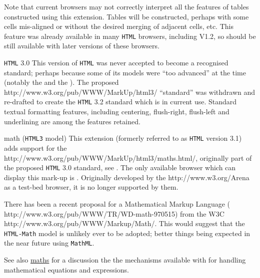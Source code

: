\begin{htmllist}
Note that current browsers may not correctly interpret all
the features of tables constructed using this extension.
Tables will be constructed, perhaps with some cells mis-aligned
or without the desired merging of adjacent cells, etc.
This feature was already available in many \texttt{HTML} browsers,
including  V1.2, so should be still
available with later versions of these browsers.


%
\item[\texttt{HTML} 3.0\label{html30}]
This version of \texttt{HTML} was never accepted to become
a recognised standard; perhaps because some of its models
were ``too advanced'' at the time 
(notably the  
and the ).
The proposed %
{http://www.w3.org/pub/WWW/MarkUp/html3/}
``standard'' was withdrawn and re-drafted to create
the \texttt{HTML} 3.2 standard which is in current use.
Standard textual formatting features, including centering, flush-right,
flush-left and underlining are among the features retained.


%
%
%
%
\item[math (\texttt{HTML3} model) \strikeout{Version 3.1}]
This extension (formerly referred to as \texttt{HTML} version 3.1)
adds support for the %
{http://www.w3.org/pub/WWW/MarkUp/html3/maths.html/}, originally
part of the proposed \texttt{HTML} 3.0 standard, see .
The only available browser
which can display this mark-up is .
Originally developed by the %
{http://www.w3.org/Arena} as a test-bed browser,
it is no longer supported by them.

There has been a recent proposal for a Mathematical Markup Language
(%
{http://www.w3.org/pub/WWW/TR/WD-math-970515}) 
from the W3C %
{http://www.w3.org/pub/WWW/Markup/Math/}. 
This would suggest that the \texttt{HTML-Math} model is unlikely 
ever to be adopted; better things being expected in the near future
using \texttt{MathML}.

See also \hyperref{another page}{Section~}{}{maths} for a discussion
the the mechanisms available with \latextohtml{} for handling
mathematical equations and expressions.
\end{htmllist}




